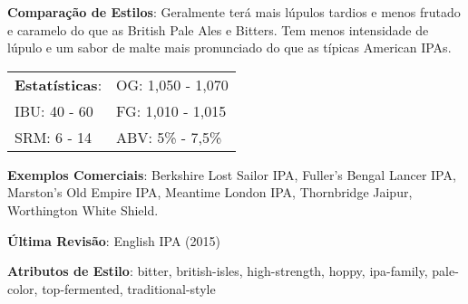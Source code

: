 \textbf{Comparação de Estilos}: Geralmente terá mais lúpulos tardios e menos frutado e caramelo do que as British Pale Ales e Bitters. Tem menos intensidade de lúpulo e um sabor de malte mais pronunciado do que as típicas American IPAs.

\begin{tabular}{@{}p{35mm}p{35mm}@{}}
  \textbf{Estatísticas}: & OG: 1,050 - 1,070 \\
  IBU: 40 - 60  & FG: 1,010 - 1,015  \\
  SRM: 6 - 14  & ABV: 5\% - 7,5\%
\end{tabular}

\textbf{Exemplos Comerciais}: Berkshire Lost Sailor IPA, Fuller's Bengal Lancer IPA, Marston’s Old Empire IPA, Meantime London IPA, Thornbridge Jaipur, Worthington White Shield.

\textbf{Última Revisão}: English IPA (2015)

\textbf{Atributos de Estilo}: bitter, british-isles, high-strength, hoppy, ipa-family, pale-color, top-fermented, traditional-style
